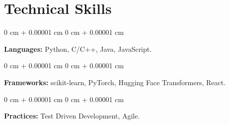 \documentclass[10pt, letterpaper]{article}
\newenvironment{highlights}{
    \begin{itemize}[
        topsep=0.10 cm,
        parsep=0.10 cm,
        partopsep=0pt,
        itemsep=0pt,
        leftmargin=0 cm + 10pt
    ]
}{
    \end{itemize}
} %
\newenvironment{onecolentry}{
    \begin{adjustwidth}{
        0 cm + 0.00001 cm
    }{
        0 cm + 0.00001 cm
    }
}{
    \end{adjustwidth}
} %
\begin{document}

    \section{Technical Skills}
        
        \begin{onecolentry}
            \textbf{Languages:} Python, C/C++, Java, JavaScript.
        \end{onecolentry}

        \vspace{0.2 cm}

        \begin{onecolentry}
            \textbf{Frameworks:} scikit-learn, PyTorch, Hugging Face Transformers, React.
        \end{onecolentry}

        \vspace{0.2 cm}

        \begin{onecolentry}
            \textbf{Practices:} Test Driven Development, Agile.
        \end{onecolentry}
    
\end{document}
